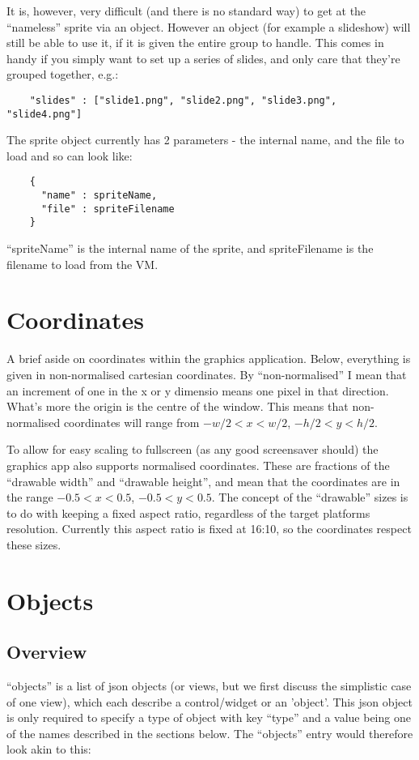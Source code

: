 \documentclass[a4paper]{article}
\begin{document}
  It is, however, very difficult (and there is no standard way) to get at
  the ``nameless'' sprite via an object. However an object (for example a
  slideshow) will still be able to use it, if it is given the entire group
  to handle. This comes in handy if you simply want to set up a series of
  slides, and only care that they're grouped together, e.g.:

  \begin{verbatim}
    "slides" : ["slide1.png", "slide2.png", "slide3.png", "slide4.png"]
  \end{verbatim}

  The sprite object currently has 2 parameters - the internal name, and the
  file to load and so can look like:

  \begin{verbatim}
    {
      "name" : spriteName,
      "file" : spriteFilename
    }
  \end{verbatim}

  ``spriteName'' is the internal name of the sprite, and spriteFilename is 
  the filename to load from the VM.

\section{Coordinates}
  A brief aside on coordinates within the graphics application. Below,
  everything is given in non-normalised cartesian coordinates. By
  ``non-normalised'' I mean that an increment of one in the x or y dimensio
  means one pixel in that direction. What's more the origin is the centre
  of the window. This means that non-normalised coordinates will range from
  $-w/2 < x < w/2$, $-h/2 < y < h/2$.

  To allow for easy scaling to fullscreen (as any good screensaver should)
  the graphics app also supports normalised coordinates. These are fractions
  of the ``drawable width'' and ``drawable height'', and mean that the
  coordinates are in the range $-0.5 < x < 0.5$, $-0.5 < y < 0.5$. The 
  concept of the ``drawable'' sizes is to do with keeping a fixed aspect 
  ratio, regardless of the target platforms resolution. Currently this 
  aspect ratio is fixed at 16:10, so the coordinates respect these sizes.


\section{Objects} 
\subsection{Overview}
  ``objects'' is a list of json objects (or views, but we first discuss the
  simplistic case of one view), which each describe a control/widget
  or an 'object'. This json object is only required to specify a type of 
  object with key ``type'' and a value being one of the names described in 
  the sections below. The ``objects'' entry would therefore look akin to 
  this:
\end{document}
